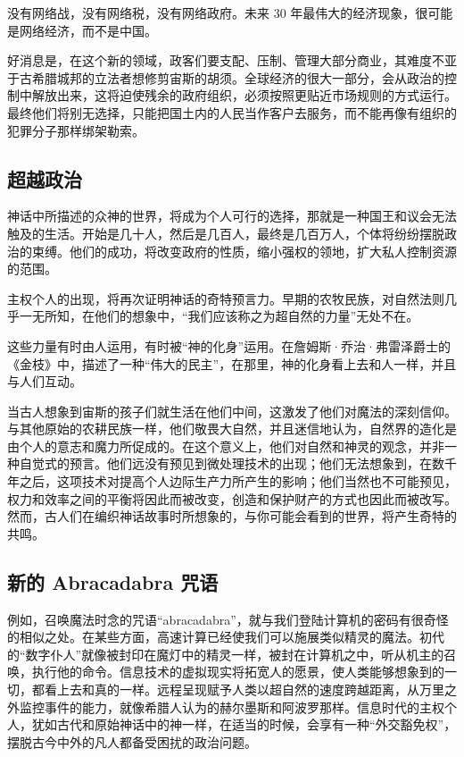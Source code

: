 没有网络战，没有网络税，没有网络政府。未来 30 年最伟大的经济现象，很可能是网络经济，而不是中国。


好消息是，在这个新的领域，政客们要支配、压制、管理大部分商业，其难度不亚于古希腊城邦的立法者想修剪宙斯的胡须。全球经济的很大一部分，会从政治的控制中解放出来，这将迫使残余的政府组织，必须按照更贴近市场规则的方式运行。最终他们将别无选择，只能把国土内的人民当作客户去服务，而不能再像有组织的犯罪分子那样绑架勒索。



\subsection{超越政治}
神话中所描述的众神的世界，将成为个人可行的选择，那就是一种国王和议会无法触及的生活。开始是几十人，然后是几百人，最终是几百万人，个体将纷纷摆脱政治的束缚。他们的成功，将改变政府的性质，缩小强权的领地，扩大私人控制资源的范围。


主权个人的出现，将再次证明神话的奇特预言力。早期的农牧民族，对自然法则几乎一无所知，在他们的想象中，“我们应该称之为超自然的力量”无处不在。


这些力量有时由人运用，有时被“神的化身”运用。在詹姆斯·乔治·弗雷泽爵士的《金枝》中，描述了一种“伟大的民主”，在那里，神的化身看上去和人一样，并且与人们互动。


当古人想象到宙斯的孩子们就生活在他们中间，这激发了他们对魔法的深刻信仰。与其他原始的农耕民族一样，他们敬畏大自然，并且迷信地认为，自然界的造化是由个人的意志和魔力所促成的。在这个意义上，他们对自然和神灵的观念，并非一种自觉式的预言。他们远没有预见到微处理技术的出现；他们无法想象到，在数千年之后，这项技术对提高个人边际生产力所产生的影响；他们当然也不可能预见，权力和效率之间的平衡将因此而被改变，创造和保护财产的方式也因此而被改写。然而，古人们在编织神话故事时所想象的，与你可能会看到的世界，将产生奇特的共鸣。



\subsection{新的 Abracadabra 咒语}
例如，召唤魔法时念的咒语“abracadabra”，就与我们登陆计算机的密码有很奇怪的相似之处。在某些方面，高速计算已经使我们可以施展类似精灵的魔法。初代的“数字仆人”就像被封印在魔灯中的精灵一样，被封在计算机之中，听从机主的召唤，执行他的命令。信息技术的虚拟现实将拓宽人的愿景，使人类能够想象到的一切，都看上去和真的一样。远程呈现赋予人类以超自然的速度跨越距离，从万里之外监控事件的能力，就像希腊人认为的赫尔墨斯和阿波罗那样。信息时代的主权个人，犹如古代和原始神话中的神一样，在适当的时候，会享有一种“外交豁免权”，摆脱古今中外的凡人都备受困扰的政治问题。


